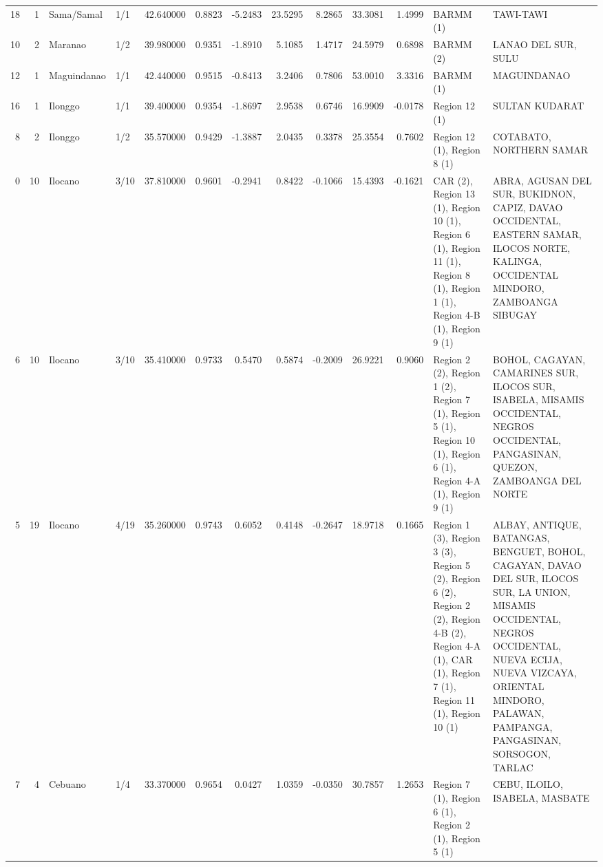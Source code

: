 \begin{tabular}{rrllrrrrrrrll}
18 & 1 & Sama/Samal & 1/1 & {\cellcolor[HTML]{F3C7B1}} \color[HTML]{000000} 42.640000 & 0.8823 & -5.2483 & 23.5295 & 8.2865 & 33.3081 & 1.4999 & BARMM (1) & TAWI-TAWI \\
10 & 2 & Maranao & 1/2 & {\cellcolor[HTML]{CFDAEA}} \color[HTML]{000000} 39.980000 & 0.9351 & -1.8910 & 5.1085 & 1.4717 & 24.5979 & 0.6898 & BARMM (2) & LANAO DEL SUR, SULU \\
12 & 1 & Maguindanao & 1/1 & {\cellcolor[HTML]{F2CAB5}} \color[HTML]{000000} 42.440000 & 0.9515 & -0.8413 & 3.2406 & 0.7806 & 53.0010 & 3.3316 & BARMM (1) & MAGUINDANAO \\
16 & 1 & Ilonggo & 1/1 & {\cellcolor[HTML]{C5D6F2}} \color[HTML]{000000} 39.400000 & 0.9354 & -1.8697 & 2.9538 & 0.6746 & 16.9909 & -0.0178 & Region 12 (1) & SULTAN KUDARAT \\
8 & 2 & Ilonggo & 1/2 & {\cellcolor[HTML]{7396F5}} \color[HTML]{F1F1F1} 35.570000 & 0.9429 & -1.3887 & 2.0435 & 0.3378 & 25.3554 & 0.7602 & Region 12 (1), Region 8 (1) & COTABATO, NORTHERN SAMAR \\
0 & 10 & Ilocano & 3/10 & {\cellcolor[HTML]{A3C2FE}} \color[HTML]{000000} 37.810000 & 0.9601 & -0.2941 & 0.8422 & -0.1066 & 15.4393 & -0.1621 & CAR (2), Region 13 (1), Region 10 (1), Region 6 (1), Region 11 (1), Region 8 (1), Region 1 (1), Region 4-B (1), Region 9 (1) & ABRA, AGUSAN DEL SUR, BUKIDNON, CAPIZ, DAVAO OCCIDENTAL, EASTERN SAMAR, ILOCOS NORTE, KALINGA, OCCIDENTAL MINDORO, ZAMBOANGA SIBUGAY \\
6 & 10 & Ilocano & 3/10 & {\cellcolor[HTML]{6F92F3}} \color[HTML]{F1F1F1} 35.410000 & 0.9733 & 0.5470 & 0.5874 & -0.2009 & 26.9221 & 0.9060 & Region 2 (2), Region 1 (2), Region 7 (1), Region 5 (1), Region 10 (1), Region 6 (1), Region 4-A (1), Region 9 (1) & BOHOL, CAGAYAN, CAMARINES SUR, ILOCOS SUR, ISABELA, MISAMIS OCCIDENTAL, NEGROS OCCIDENTAL, PANGASINAN, QUEZON, ZAMBOANGA DEL NORTE \\
5 & 19 & Ilocano & 4/19 & {\cellcolor[HTML]{6C8FF1}} \color[HTML]{F1F1F1} 35.260000 & 0.9743 & 0.6052 & 0.4148 & -0.2647 & 18.9718 & 0.1665 & Region 1 (3), Region 3 (3), Region 5 (2), Region 6 (2), Region 2 (2), Region 4-B (2), Region 4-A (1), CAR (1), Region 7 (1), Region 11 (1), Region 10 (1) & ALBAY, ANTIQUE, BATANGAS, BENGUET, BOHOL, CAGAYAN, DAVAO DEL SUR, ILOCOS SUR, LA UNION, MISAMIS OCCIDENTAL, NEGROS OCCIDENTAL, NUEVA ECIJA, NUEVA VIZCAYA, ORIENTAL MINDORO, PALAWAN, PAMPANGA, PANGASINAN, SORSOGON, TARLAC \\
7 & 4 & Cebuano & 1/4 & {\cellcolor[HTML]{465ECF}} \color[HTML]{F1F1F1} 33.370000 & 0.9654 & 0.0427 & 1.0359 & -0.0350 & 30.7857 & 1.2653 & Region 7 (1), Region 6 (1), Region 2 (1), Region 5 (1) & CEBU, ILOILO, ISABELA, MASBATE \\

\end{tabular}
